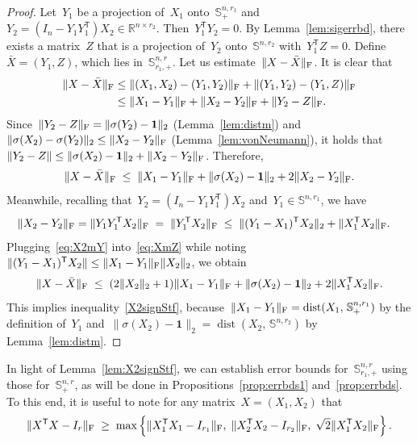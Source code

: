 \documentclass[11pt,a4paper]{article}  %
\theoremstyle{definition}
\DeclareMathOperator{\dist}{dist}
\newcommand{\RR}{\mathbb{R}}
\newcommand{\col}{r}
\newcommand{\stf}[1]{\mathbb{S}^{#1}}
\newcommand{\fro}{{\scriptstyle{\textnormal{F}}}}
\newcommand{\trs}{{\scriptstyle{\mathsf{T}}}}
\newcommand{\ones}{\mathbf{1}}
\begin{document}
\begin{proof}
Let~$Y_1$ be a projection of~$X_1$ onto~$\stf{n, \col_1}_+$
and~$Y_2 = (I_{n} - Y_1Y_1^\trs)X_2\in\RR^{n\times \col_2}$.
Then~$Y_1^\trs Y_2 = 0$.
By Lemma~\ref{lem:sigerrbd}, there exists a matrix~$Z$ that is a projection of~$Y_2$
onto~$\stf{n, \col_2}$ with~$Y_1^\trs Z = 0$.
Define~$\bar{X} = (Y_1, Z)$, which lies in~$\stf{n, \col}_{\col_1,+}$.
Let us estimate~$\|X - \bar{X}\|_\fro$. It is clear that
\begin{equation}
    \nonumber
\begin{split}
\|X - \bar{X}\|_\fro
\le\; & \|(X_1, X_2) - (Y_1, Y_2)\|_\fro + \| (Y_1, Y_2) - (Y_1, Z)\|_\fro \\
\;\le\; & \|X_1 - Y_1\|_\fro + \|X_2 - Y_2\|_\fro + \|Y_2 - Z\|_\fro.
\end{split}
\end{equation}
Since~$\|Y_2-Z\|_\fro = \|\sigma(Y_2) - \ones\|_2$ (Lemma~\ref{lem:distm}) and
$\|\sigma(X_2)-\sigma(Y_2)\|_2\le\|X_2-Y_2\|_\fro$ (Lemma~\ref{lem:vonNeumann}),
it holds that~$\|Y_2-Z\|\le\|\sigma(X_2) - \ones\|_2 + \|X_2 - Y_2 \|_\fro$.
Therefore,
\begin{equation}
    \label{eq:XmZ}
    \|X-\bar{X}\|_\fro \;\le\; \|X_1-Y_1\|_\fro + \|\sigma(X_2) - \ones\|_2 + 2\|X_2 - Y_2\|_\fro.
\end{equation}
Meanwhile, recalling that~$Y_2=(I_n - Y_1Y_1^\trs) X_2$ and~$Y_1\in\stf{n,\col_1}$,
we have
\begin{equation}
    \label{eq:X2mY}
    \begin{split}
    \|X_2 - Y_2\|_\fro =\; & \|Y_1Y_1^\trs X_2\|_\fro \;= \;\|Y_1^\trs X_2\|_\fro
    \;\le\;\|(Y_1-X_1)^\trs X_2\|_2 + \|X_1^\trs X_2\|_\fro.
    \end{split}
\end{equation}
Plugging~\eqref{eq:X2mY} into~\eqref{eq:XmZ}
while noting~$\|(Y_1-X_1)^\trs X_2\|\le\|X_1-Y_1\|_\fro\|X_2\|_2$, we obtain%
\begin{equation*}
    \|X-\bar{X}\|_\fro \;\le\; (2\|X_2\|_2 + 1)\|X_1-Y_1\|_\fro + \|\sigma(X_2) - \ones\|_2 + 2\|X_1^\trs X_2\|_\fro.
\end{equation*}
This implies inequality~\eqref{X2signStf}, because~$\|X_1-Y_1\|_\fro =\dist(X_1,\,\stf{n,\col_1}_+)$
by the definition of~$Y_1$
and~$\|\sigma(X_2) - \ones\|_2 =\dist(X_2,\,\stf{n,\col_2})$ by Lemma~\ref{lem:distm}.
\end{proof}


In light of Lemma~\ref{lem:X2signStf}, we can establish error bounds for~$\stf{n,\col}_{\col_1,+}$
using those for~$\stf{n,\col}_{+}$, as will be done in Propositions~\ref{prop:errbds1}
and~\ref{prop:errbds}. To this end, it is useful to note for any matrix~$X=(X_1, X_2)$ that
\begin{equation}
    \label{eq:sumdist}
    \|X^\trs X -I_{\col}\|_\fro \;\ge\;
    \max\left\{\|X_1^\trs X_1-I_{\col_1}\|_\fro,\;
    \|X_2^\trs X_2-I_{\col_2}\|_\fro,\;
\sqrt{2}\|X_1^\trs X_2\|_\fro\right\}.
\end{equation}
\end{document}

